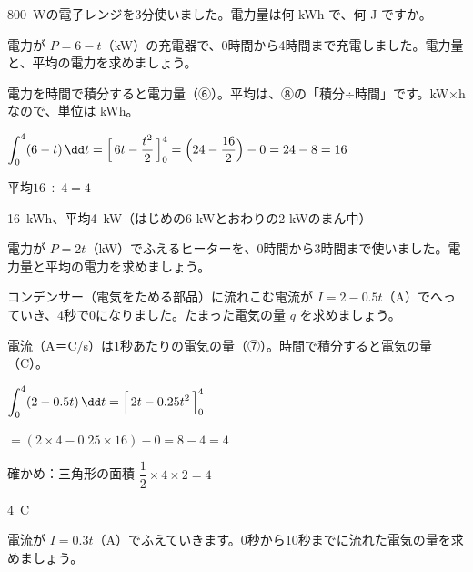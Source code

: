 \begin{jibun}
\qty{800}{W}の電子レンジを3分使いました。電力量は何 kWh で、何 J ですか。
\end{jibun}

\begin{reidai}[電力量と平均の電力]
電力が $P=6-t$（kW）の充電器で、0時間から4時間まで充電しました。電力量と、平均の電力を求めましょう。\par
\kangaekata 電力を時間で積分すると電力量（⑥）。平均は、⑧の「積分÷時間」です。kW×h なので、単位は kWh。\par
\shiki $\displaystyle\int_0^4(6-t)\,\dd t=\Bigl[\,6t-\frac{t^2}{2}\,\Bigr]_0^4=\Bigl(24-\frac{16}{2}\Bigr)-0=24-8=16$\par
\hspace*{2.6\zw}平均\quad $16\div4=4$\par
\kotae \qty{16}{kWh}、平均\qty{4}{kW}（はじめの6 kWとおわりの2 kWのまん中）
\end{reidai}

\begin{jibun}
電力が $P=2t$（kW）でふえるヒーターを、0時間から3時間まで使いました。電力量と平均の電力を求めましょう。
\end{jibun}

\begin{reidai}[電流から電気の量]
コンデンサー（電気をためる部品）に流れこむ電流が $I=2-0.5t$（A）でへっていき、4秒で0になりました。たまった電気の量 $q$ を求めましょう。\par
\kangaekata 電流（A＝C/s）は1秒あたりの電気の量（⑦）。時間で積分すると電気の量（C）。\par
\shiki $\displaystyle\int_0^4(2-0.5t)\,\dd t=\Bigl[\,2t-0.25t^2\,\Bigr]_0^4$\par
\hspace*{2.6\zw}$=(2\times4-0.25\times16)-0=8-4=4$\par
\hspace*{2.6\zw}確かめ：三角形の面積 $\dfrac{1}{2}\times4\times2=4$\par
\kotae \qty{4}{C}
\end{reidai}

\begin{jibun}
電流が $I=0.3t$（A）でふえていきます。0秒から10秒までに流れた電気の量を求めましょう。
\end{jibun}

